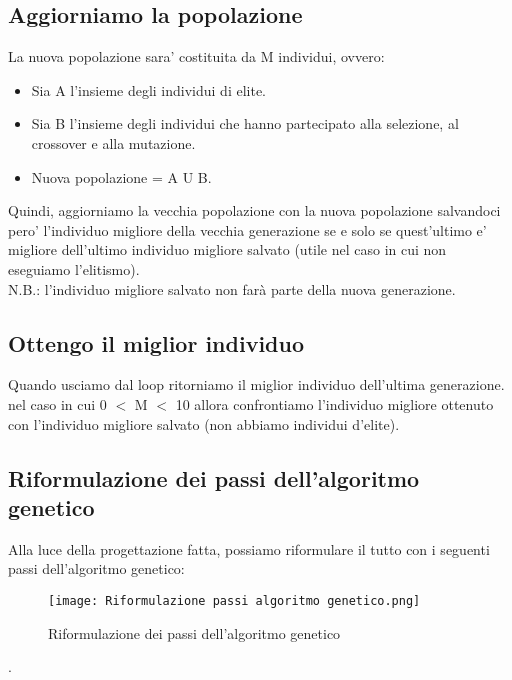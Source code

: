 \documentclass[10pt,a4paper]{article}
\begin{document}
  
    \subsection{Aggiorniamo la popolazione}
    \label{aggiorniamoPopolazioneSubsection}
    La nuova popolazione sara' costituita da M individui, ovvero:
    \begin{itemize}
      \item Sia A l'insieme degli individui di elite.
      \item Sia B l'insieme degli individui che hanno partecipato alla selezione, al crossover e alla mutazione.
      \item Nuova popolazione = A U B.
    \end{itemize}
    Quindi, aggiorniamo la vecchia popolazione con la nuova popolazione salvandoci pero' l'individuo 
    migliore della vecchia generazione se e solo se quest'ultimo e' migliore dell'ultimo individuo 
    migliore salvato (utile nel caso in cui non eseguiamo l'elitismo).\\
    N.B.: l'individuo migliore salvato non farà parte della nuova generazione.
    
  
    \subsection{Ottengo il miglior individuo}
    \label{ottengoMigliorIndividuoSubsection}
    Quando usciamo dal loop ritorniamo il miglior individuo dell'ultima generazione.\\
    nel caso in cui 0  $<$ M $<$ 10 allora confrontiamo l'individuo migliore ottenuto con l'individuo migliore salvato (non abbiamo individui d'elite).
    
  
    \subsection{Riformulazione dei passi dell'algoritmo genetico}
    \label{riformulazioneDeiPassiAlgoritmoGeneticoSubsection}
    Alla luce della progettazione fatta, possiamo riformulare il tutto con i seguenti passi 
    dell'algoritmo genetico: 
    \begin{figure}[h!]
      \centering
      \caption{Riformulazione dei passi dell'algoritmo genetico}
      \texttt{[image: Riformulazione passi algoritmo genetico.png]}
      \label{Riformulazione passi algoritmo genetico}
    \end{figure}
    .
   
     
\end{document}
